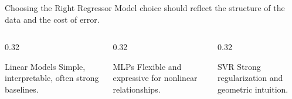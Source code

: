 \documentclass[12pt]{beamer}
\begin{document}
\begin{frame}{Choosing the Right Regressor}
  \justifying
  Model choice should reflect the structure of the data and the cost of error.
  \begin{columns}[T]
    \begin{column}{0.32\textwidth}
      \begin{examplebox}{Linear Models}
        Simple, interpretable, often strong baselines.
      \end{examplebox}
    \end{column}
    \begin{column}{0.32\textwidth}
      \begin{examplebox}{MLPs}
        Flexible and expressive for nonlinear relationships.
      \end{examplebox}
    \end{column}
    \begin{column}{0.32\textwidth}
      \begin{examplebox}{SVR}
        Strong regularization and geometric intuition.
      \end{examplebox}
    \end{column}
  \end{columns}
\end{frame}
\end{document}

